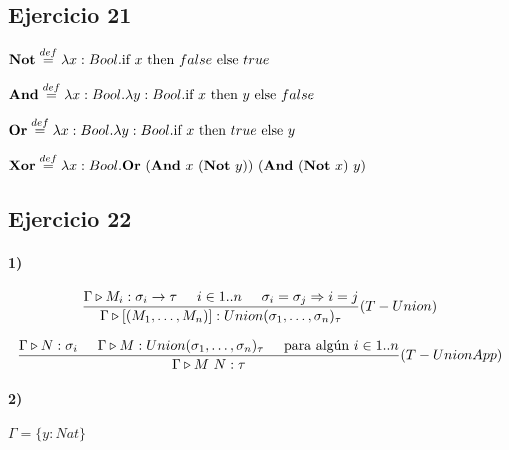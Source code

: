 \documentclass[10pt,a4paper, landscape]{article}
\begin{document}
\subsection{Ejercicio 21}
\begin{multicols}{2}
$\textbf{Not} \overset{def}{=} \lambda x: Bool \text{.} \text{if } x \text{ then } false \text{ else } true$

\vspace*{5mm}
$\textbf{And} \overset{def}{=} \lambda x: Bool \text{.} \lambda y: Bool \text{.} \text{if } x \text{ then } y \text{ else } false$

\vfill

$\textbf{Or} \overset{def}{=} \lambda x: Bool \text{.} \lambda y: Bool \text{.} \text{if } x \text{ then } true \text{ else } y$

\vspace*{5mm}
$\textbf{Xor} \overset{def}{=} \lambda x: Bool \text{.} \textbf{Or}~(\textbf{And}~x~(\textbf{Not}~y))~(\textbf{And}~(\textbf{Not}~x)~y)$
\end{multicols}

\subsection*{Ejercicio 22}
\paragraph{1)}

\begin{multicols}{2}
$$\frac{\Gamma\triangleright M_i : \sigma_i\to\tau\hspace*{5mm}i\in1..n\hspace*{5mm}\sigma_i=\sigma_j\Rightarrow i =j }{\Gamma\triangleright [(M_1,\dots,M_n)] : Union(\sigma_1,\dots,\sigma_n)_\tau}(T-Union)$$

\vspace*{5mm}
$$\frac{\Gamma\triangleright N : \sigma_i\hspace*{5mm}\Gamma\triangleright M : Union(\sigma_1,\dots,\sigma_n)_\tau\hspace*{5mm}\text{para algún }  i\in1..n }{\Gamma\triangleright M~N : \tau}(T-UnionApp)$$
\end{multicols}

\newpage
\paragraph{2)} $\Gamma = \{y: Nat\}$
\end{document}
